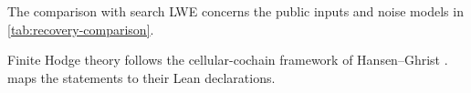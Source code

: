 The comparison with search LWE \cite[Section~1]{regev2009lwe} concerns the
public inputs and noise models in \cref{tab:recovery-comparison}.


Finite Hodge theory follows the cellular-cochain framework of
Hansen--Ghrist \cite{hansenGhrist2018sheaves}. 
maps the statements to their Lean declarations.
